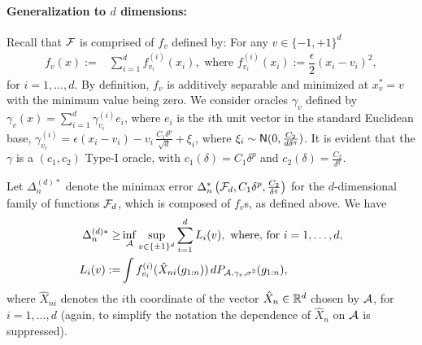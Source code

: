 \paragraph{Generalization to $d$ dimensions:}
Recall that $\mathcal{F}$ is comprised of $f_v$ defined by: For any $v\in \{-1,+1\}^d$
\begin{align*}
  f_v(x) :=& \sum_{i=1}^d f^{(i)}_{v_i}(x_i), \text{ where } f^{(i)}_{v_i}(x_i) := \dfrac{\epsilon}{2} (x_i - v_i)^2,
\end{align*}
for $i=1,\ldots,d$.
By definition, $f_v$ is additively separable and minimized at $x^*_v=v$ with the minimum value being zero.
We consider oracles $\gamma_v$ defined by
$\gamma_v(x) = \sum_{i=1}^d \gamma_{v_i}^{(i)}e_i$, where 
$e_i$ is the $i$th unit vector in the standard Euclidean base,
$\gamma_{v_i}^{(i)} = \epsilon(x_i-v_i) - v_i\, \frac{C_1 \delta^p}{\sqrt{d}} + \xi_i$, where $\xi_i \sim \mathsf{N}(0,\frac{C_2}{d\delta^q})$. 
It is evident that the $\gamma$ is a $(c_1,c_2)$ Type-I oracle, with $c_1(\delta)=C_1\delta^p$ and $c_2(\delta)=\frac{C_2}{\delta^q}$.

Let $\Delta_n^{(d)*}$ denote the minimax error $\Delta_n^*\left(\mathcal{F}_d, C_1\delta^p,\frac{C_2}{\delta^q}\right)$ for the $d$-dimensional family of functions $\mathcal{F}_d$, which is composed of $f_v$s, as defined above. We have
\begin{align*}
 \Delta_n^{(d)*} \ge& \inf_{\mathcal{A}}  \sup_{v\in \{\pm 1 \}^d}\sum_{i=1}^d L_i(v), \text{ where, for } i=1,\ldots,d,\\
 L_i(v) := & \int f^{(i)}_{v_i}(\hat X_{ni}(g_{1:n}) )\, dP_{\mathcal{A},\gamma_v,\sigma^2}(g_{1:n}),  
\end{align*}
where $\hat{X}_{ni}$ denotes the $i$th coordinate of the vector $\hat{X}_n \in \mathbb{R}^d$ chosen by $\mathcal{A}$, for $i=1,\ldots,d$
(again, to simplify the notation the dependence of $\hat{X}_n$ on $\mathcal{A}$ is suppressed).



